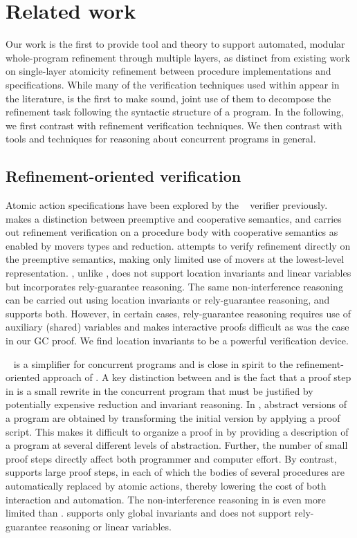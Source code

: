 
\section{Related work}
\label{sec:related}

Our work is the first to provide tool and theory to support automated,
modular whole-program refinement through multiple layers, as distinct from existing work on
single-layer atomicity refinement between procedure implementations and
specifications. 
While many of the verification techniques used within \civl appear in
the literature, \civl is the first to make sound, joint use of them to
decompose the refinement task following the syntactic structure of a
program. In the following, we first contrast \civl with refinement
verification techniques. We then contrast \civl with tools and
techniques for reasoning about concurrent programs in general. 

\subsection{Refinement-oriented verification}
Atomic action specifications have been explored by the
\calvin~\cite{FlanaganFQS05,FreundQ04} verifier previously. 
\civl makes a distinction between preemptive and cooperative
semantics, and carries out refinement verification on a procedure body
with cooperative semantics as enabled by movers types and reduction.
\calvin attempts to verify refinement directly on the preemptive
semantics, making only limited use of movers at the lowest-level
representation. 
\calvin, unlike \civl, does not support location invariants and linear
variables but incorporates rely-guarantee reasoning. 
The same non-interference reasoning can be carried out using location
invariants or rely-guarantee reasoning, and \civl supports both.  
However, in certain cases, rely-guarantee reasoning
requires use of auxiliary (shared) variables and makes interactive
proofs difficult as was the case in our GC proof. We find location
invariants to be a powerful verification device.  

\QED~\cite{ElmasQT09} is a simplifier for concurrent programs and is close in spirit to the 
refinement-oriented approach of \civl.
A key distinction between \civl and \QED is the fact that a proof step in \QED is a small rewrite in the concurrent program
that must be justified by potentially expensive reduction and invariant reasoning.
In \QED, abstract versions of a program are obtained by transforming the initial
version by applying a proof script. 
This makes it difficult to organize a proof in \QED by providing a
description of a program at several different levels of abstraction. 
Further, the number of small proof steps directly affect both programmer
and computer effort. 
By contrast, \civl supports large proof steps, in each of which the bodies of several procedures
are automatically replaced by atomic actions, thereby lowering the cost of both interaction and automation.
The non-interference reasoning in \QED is even more limited than \calvin.
\QED supports only global invariants and does not support rely-guarantee reasoning or linear variables.

